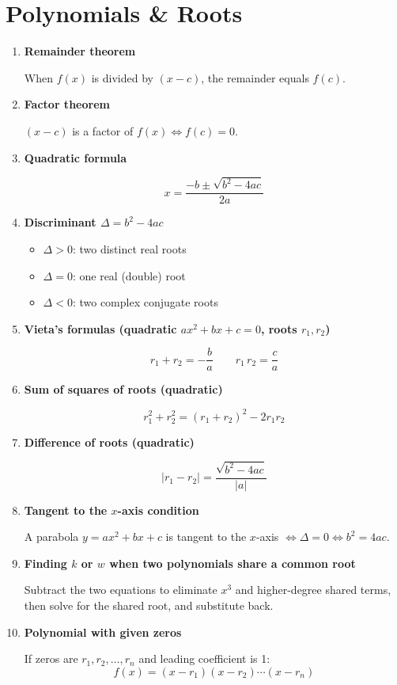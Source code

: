 \documentclass[10pt,letterpaper]{article}
\begin{document}
\section{Polynomials \& Roots}

\begin{enumerate}

\item \textbf{Remainder theorem}

When $f(x)$ is divided by $(x-c)$, the remainder equals $f(c)$.

\item \textbf{Factor theorem}

$(x-c)$ is a factor of $f(x) \iff f(c) = 0$.

\item \textbf{Quadratic formula}

$$x = \frac{-b \pm \sqrt{b^2-4ac}}{2a}$$

\item \textbf{Discriminant $\Delta = b^2 - 4ac$}

\begin{itemize}
  \item $\Delta > 0$: two distinct real roots
  \item $\Delta = 0$: one real (double) root
  \item $\Delta < 0$: two complex conjugate roots
\end{itemize}

\item \textbf{Vieta's formulas (quadratic $ax^2+bx+c=0$, roots $r_1, r_2$)}

$$r_1 + r_2 = -\frac{b}{a} \qquad r_1\,r_2 = \frac{c}{a}$$

\item \textbf{Sum of squares of roots (quadratic)}

$$r_1^2 + r_2^2 = (r_1+r_2)^2 - 2r_1 r_2$$

\item \textbf{Difference of roots (quadratic)}

$$|r_1 - r_2| = \frac{\sqrt{b^2-4ac}}{|a|}$$

\item \textbf{Tangent to the $x$-axis condition}

A parabola $y = ax^2+bx+c$ is tangent to the $x$-axis $\iff \Delta = 0 \iff b^2 = 4ac$.

\item \textbf{Finding $k$ or $w$ when two polynomials share a common root}

Subtract the two equations to eliminate $x^3$ and higher-degree shared terms, then solve for the shared root, and substitute back.

\item \textbf{Polynomial with given zeros}

If zeros are $r_1, r_2, \ldots, r_n$ and leading coefficient is 1:
$$f(x) = (x-r_1)(x-r_2)\cdots(x-r_n)$$

\end{enumerate}
\end{document}
